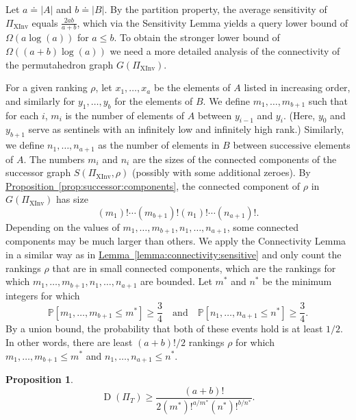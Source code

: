 \documentclass[11pt]{article}
\numberwithin{equation}{section}
\newtheorem{proposition}[theorem]{Proposition}
\theoremstyle{definition}
\theoremstyle{plain}
\newcommand{\expref}[2]{\hyperref[#2]{#1~\ref{#2}}}
\renewcommand{\Pr}{\mathbb{P}}
\newcommand{\ranking}{\rho}
\DeclareMathOperator{\XInv}{XInv}
\DeclareMathOperator{\traces}{D}
\begin{document}
Let $a\doteq |A|$ and $b\doteq |B|$. By the partition property, the average sensitivity of $\Pi_{\XInv}$ equals $\frac{2ab}{a+b}$, which via the Sensitivity Lemma yields a query lower bound of $\Omega(a \log(a))$ for $a \le b$. To obtain the stronger lower bound of $\Omega((a+b)\log(a))$ we need a more detailed analysis of the connectivity of the permutahedron graph $G(\Pi_{\XInv})$. 

For a given ranking $\ranking$, let $x_1,\dots,x_{a}$ be the elements of $A$ listed in increasing order, and similarly for $y_1,\dots,y_b$ for the elements of $B$. We define $m_1,\dots,m_{b+1}$ such that for each $i$, $m_i$ is the number of elements of $A$ between $y_{i-1}$ and $y_i$. (Here, $y_0$ and $y_{b+1}$ serve as sentinels with an infinitely low and infinitely high rank.) Similarly, we define $n_1,\dots,n_{a+1}$ as the number of elements in $B$ between successive elements of $A$. The numbers $m_i$ and $n_i$ are the sizes of the connected components of the successor graph $S(\Pi_{\XInv},\ranking)$ (possibly with some additional zeroes). By \expref{Proposition}{prop:successor:components}, the connected component of $\ranking$ in $G(\Pi_{\XInv})$ has size
\begin{equation}
    \label{eq:mann-whitney:cc-size}
    (m_1)!\cdots (m_{b+1})!(n_1)!\cdots (n_{a+1})!.
\end{equation}
Depending on the values of $m_1,\dots,m_{b+1},n_1,\dots,n_{a+1}$, some connected components may be much larger than others. We apply the Connectivity Lemma in a similar way as in \expref{Lemma}{lemma:connectivity:sensitive} and only count the rankings $\ranking$ that are in small connected components, which are the rankings for which $m_1,\dots,m_{b+1},n_1,\dots,n_{a+1}$ are bounded. Let $m^*$ and $n^*$ be the minimum integers for which 
\begin{equation*}
    \Pr[m_1,\dots,m_{b+1} \le m^*] \ge \frac{3}{4}\quad\text{and}\quad
    \Pr[n_1,\dots,n_{a+1} \le n^*] \ge \frac{3}{4}.
\end{equation*}
By a union bound, the probability that both of these events hold is at least $1/2$. In other words, there are least $(a+b)!/2$ rankings $\ranking$ for which $m_1,\dots,m_{b+1}\le m^*$ and $n_1,\dots,n_{a+1}\le n^*$.
\begin{proposition}\label{prop:mann-whitney:cc-bound}
    \begin{equation}\label{eq:mann-whitney:cc-bound}
        \traces(\Pi_T) \ge \frac{(a+b)!}{2(m^*)!^{a/m^*}(n^*)!^{b/n^*}}.
    \end{equation}
\end{proposition}
\end{document}
